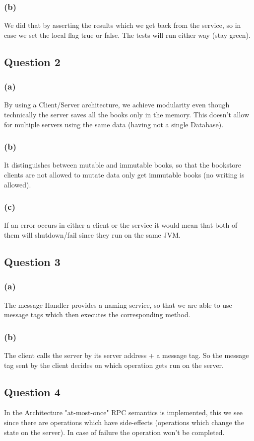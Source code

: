 \documentclass[12pt,a4paper]{article}
\begin{document}
\subsubsection{(b)}
We did that by asserting the results which we get back from the service, so in case we set the local flag true or false. The tests will run either way (stay green).

\subsection{Question 2}
\subsubsection{(a)}
By using a Client/Server architecture, we achieve modularity even though technically the server saves all the books only in the memory. This doesn't allow for multiple servers using the same data (having not a single Database).
\subsubsection{(b)}
It distinguishes between mutable and immutable books, so that the bookstore clients are not allowed to mutate data only get immutable books (no writing is allowed).
\subsubsection{(c)}
If an error occurs in either a client or the service it would mean that both of them will shutdown/fail since they run on the same JVM.
\subsection{Question 3}
\subsubsection{(a)}
The message Handler provides a naming service, so that we are able to use message tags which then executes the corresponding method.
\subsubsection{(b)}
The client calls the server by its server address + a message tag. So the message tag sent by the client decides on which operation gets run on the server.
\subsection{Question 4}
In the Architecture "at-most-once" RPC semantics is implemented, this we see since there are operations which have side-effects (operations which change the state on the server).
In case of failure the operation won't be completed.
\end{document}
